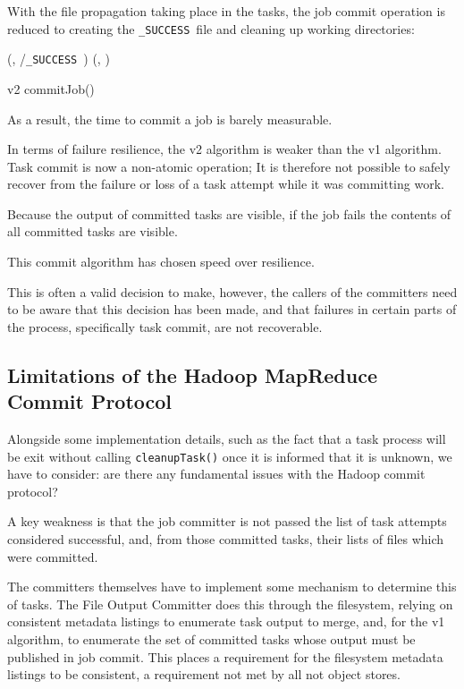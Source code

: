 \documentclass[conference]{IEEEtran}
\newcommand{\SUCCESS}{\texttt{\_SUCCESS}\ }
\begin{document}
With the file propagation taking place in the tasks, the job commit
operation is reduced to creating the \SUCCESS file and cleaning up
working directories:

\begin{procedure*}
\FileOutputCommitVars

  \touch(\fs, \dest/\SUCCESS)\;
  \delete(\fs, \temp)\;

\label{alg:commitJobV2}

\caption{v2 commitJob()}
\end{procedure*}

As a result, the time to commit a job is barely measurable.

In terms of failure resilience, the v2 algorithm is weaker than the v1 algorithm.
Task commit is now a non-atomic operation;
It is therefore not possible to safely recover from the failure or loss of a task attempt
while it was committing work.

Because the output of committed tasks are visible,
if the job fails the contents of all committed tasks are visible.

This commit algorithm has chosen speed over resilience.

This is often a valid decision to make, however, the callers of the committers
need to be aware that this decision has been made, and that failures in
certain parts of the process, specifically task commit, are not recoverable.

\subsection{Limitations of the Hadoop MapReduce Commit Protocol}
\label{subsec:hadoop-commit-protocol}

Alongside some implementation details, such as the fact that a task process
will be exit without calling \texttt{cleanupTask()} once it is informed that it
is unknown, we have to consider: are there any fundamental issues with
the Hadoop commit protocol?

A key weakness is that the job committer is not passed the list of task
attempts considered successful, and, from those committed tasks, their
lists of files which were committed.

The committers themselves have to implement some mechanism to determine this
of tasks.
The File Output Committer does this through the filesystem, relying on consistent
metadata listings to enumerate task output to merge, and, for the v1 algorithm,
to enumerate the set of committed tasks whose output must be published in job commit.
This places a requirement for the filesystem metadata listings to be consistent,
a requirement not met by all not object stores.
\end{document}
